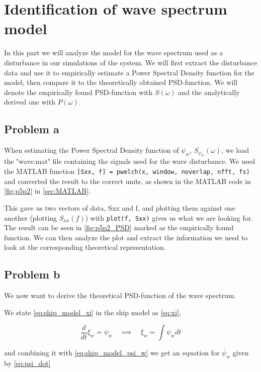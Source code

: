 \section{Identification of wave spectrum model}

In this part we will analyze the model for the wave spectrum used as a disturbance in our simulations of the system. We will first extract the disturbance data and use it to empirically estimate a Power Spectral Density function for the model, then compare it to the theoretically obtained PSD-function. We will denote the empirically found PSD-function with $S(\omega)$ and the analytically derived one with $P(\omega)$.

\subsection{Problem a}

When estimating the Power Spectral Density function of $\psi_w$, $S_{\psi_w}(\omega)$, we load the "wave.mat" file containing the signals used for the wave disturbance. We used the MATLAB function \texttt{[Sxx, f] = pwelch(x, window, noverlap, nfft, fs)} and converted the result to the correct units, as shown in the MATLAB code in \cref{fig:p5p2} in \cref{sec:MATLAB}.
 
This gave us two vectors of data, Sxx and f, and plotting them against one another (plotting $S_{xx}(f)$)  with \texttt{plot(f, Sxx)} gives us what we are looking for. The result can be seen in \cref{fig:p5p2_PSD} marked as the empirically found function.
We can then analyze the plot and extract the information we need to look at the corresponding theoretical representation.


\subsection{Problem b}


We now want to derive the theoretical PSD-function of the wave spectrum.

We state \cref{eq:ship_model_xi} in the ship model as \cref{eq:xi}, 

\begin{equation} \label{eq:xi}
    \frac{d}{dt} \xi_w = \psi_w
    \quad \implies \quad \xi_w = \int \psi_w dt
\end{equation}

and combining it with \cref{eq:ship_model_psi_w} we get an equation for $\dot{\psi_w}$ given by \cref{eq:psi_dot}

